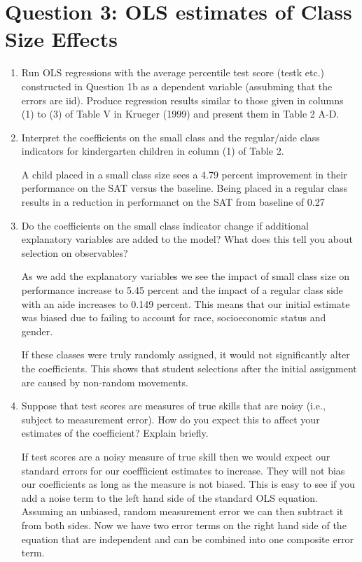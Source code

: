 \documentclass{article}
\begin{document}
\section{Question 3:  OLS estimates of Class Size Effects}

\begin{enumerate}[label=\alph*]

\item Run OLS regressions with the average percentile test score (testk etc.) constructed in Question 1b as a dependent variable (assubming that the errors are iid). Produce regression results similar to those given in columns (1) to (3) of Table V in Krueger (1999) and present them in Table 2 A-D.



\item  Interpret the coefficients on the small class and the regular/aide class indicators for kindergarten children in column (1) of Table 2.

A child placed in a small class size sees a 4.79 percent improvement in their performance on the SAT versus the baseline.  Being placed in a regular class results in a reduction in performanct on the SAT from baseline of 0.27%

\item  Do the coefficients on the small class indicator change if additional explanatory variables are added to the model? What does this tell you about selection on observables?

As we add the explanatory variables we see the impact of small class size on performance increase to 5.45 percent and the impact of a regular class side with an aide increases to 0.149 percent.  This means that our initial estimate was biased due to failing to account for race, socioeconomic status and gender.  

If these classes were truly randomly assigned, it would not significantly alter the coefficients. This shows that student selections after the initial assignment are caused by non-random movements.

\item  Suppose that test scores are measures of true skills that are noisy (i.e., subject to measurement error). How do you expect this to affect your estimates of the coefficient? Explain briefly.

If test scores are a noisy measure of true skill then we would expect our standard errors for our coeffficient estimates to increase.  They will not bias our coefficients as long as the measure is not biased.  This is easy to see if you add a noise term to the left hand side of the standard OLS equation.  Assuming an unbiased, random measurement error we can then subtract it from both sides.  Now we have two error terms on the right hand side of the equation that are independent and can be combined into one composite error term.

\end{enumerate}
\end{document}
